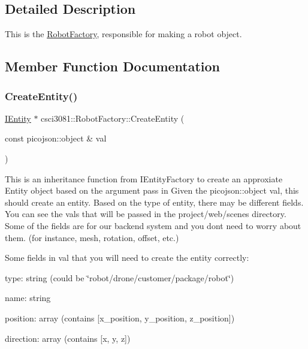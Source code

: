 \subsection{Detailed Description}
This is the \hyperlink{classcsci3081_1_1RobotFactory}{Robot\+Factory}, responsible for making a robot object. 

\subsection{Member Function Documentation}
\mbox{\label{classcsci3081_1_1RobotFactory_a5775ecc230c01ae455284cd04f491129}} 
\subsubsection{\texorpdfstring{Create\+Entity()}{CreateEntity()}}
{\footnotesize\ttfamily \hyperlink{classentity__project_1_1IEntity}{I\+Entity} $\ast$ csci3081\+::\+Robot\+Factory\+::\+Create\+Entity (\begin{DoxyParamCaption}\item[{const picojson\+::object \&}]{val }\end{DoxyParamCaption})\hspace{0.3cm}{\ttfamily [virtual]}}



This is an inheritance function from I\+Entity\+Factory to create an approxiate Entity object based on the argument pass in Given the picojson\+::object val, this should create an entity. Based on the type of entity, there may be different fields. You can see the vals that will be passed in the project/web/scenes directory. Some of the fields are for our backend system and you don\textquotesingle{}t need to worry about them. (for instance, mesh, rotation, offset, etc.) 

Some fields in val that you will need to create the entity correctly\+:

type\+: string (could be \char`\"{}robot/drone/customer/package/robot\char`\"{})

name\+: string

position\+: array (contains \mbox{[}x\+\_\+position, y\+\_\+position, z\+\_\+position\mbox{]})

direction\+: array (contains \mbox{[}x, y, z\mbox{]})

